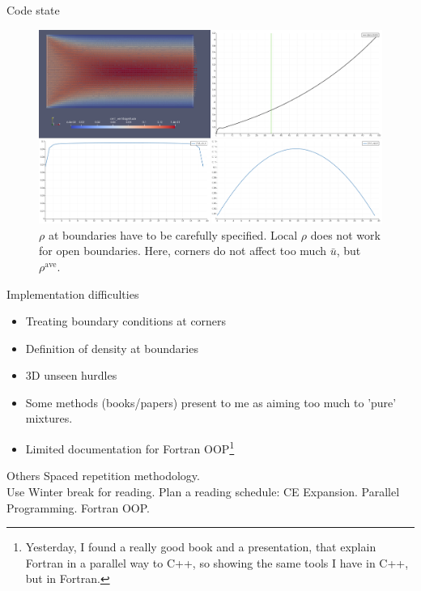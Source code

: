 \documentclass{beamer}
\begin{document}
	\begin{frame}{Code state}
		\begin{figure}
			\includegraphics[scale=0.16]{pics/bcCorrected.png}
			\caption{$\rho$ at boundaries have to be carefully specified. Local $\rho$ does not work for open boundaries. Here, corners do not affect too much $\bar{u}$, but $\rho^{\text{ave}}$.}
		\end{figure}
	\end{frame}

	\begin{frame}{Implementation difficulties}
		\begin{itemize}
			\item Treating boundary conditions at corners
			\item Definition of density at boundaries
			\item 3D unseen hurdles
			\item Some methods (books/papers) present to me as aiming too much to 'pure' mixtures.
			\item \alert{Limited documentation for Fortran OOP}\footnote{\tiny Yesterday, I found a really good book and a presentation, that explain Fortran in a parallel way to C++, so showing the same tools I have in C++, but in Fortran.}
		\end{itemize}
	\end{frame}
	
	\begin{frame}{Others}
		Spaced repetition methodology.\\
		Use Winter break for reading. Plan a reading schedule: CE Expansion. Parallel Programming. Fortran OOP. 
	\end{frame}
	
	
\end{document}
